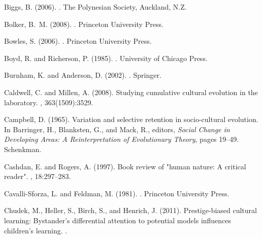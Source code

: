 Biggs, B. (2006).
.
\newblock The Polynesian Society, Auckland, N.Z.

Bolker, B.~M. (2008).
.
\newblock Princeton University Press.

Bowles, S. (2006).
.
\newblock Princeton University Press.

Boyd, R. and Richerson, P. (1985).
.
\newblock University of Chicago Press.

Burnham, K. and Anderson, D. (2002).
.
\newblock Springer.

Caldwell, C. and Millen, A. (2008).
\newblock Studying cumulative cultural evolution in the laboratory.
, 363(1509):3529.

Campbell, D. (1965).
\newblock Variation and selective retention in socio-cultural evolution.
\newblock In Barringer, H., Blanksten, G., and Mack, R., editors, {\em Social
  Change in Developing Areas: A Reinterpretation of Evolutionary Theory}, pages
  19--49. Schenkman.

Cashdan, E. and Rogers, A. (1997).
\newblock Book review of "human nature: A critical reader".
, 18:297--283.

Cavalli-Sforza, L. and Feldman, M. (1981).
.
\newblock Princeton University Press.

Chudek, M., Heller, S., Birch, S., and Henrich, J. (2011).
\newblock Prestige-biased cultural learning: Bystander's differential attention
  to potential models influences children's learning.
.

